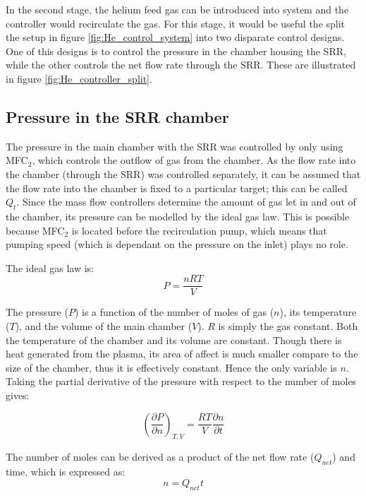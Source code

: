 In the second stage, the helium feed gas can be introduced into system and the controller would recirculate the gas. For this stage, it would be useful the split the setup in figure \ref{fig:He_control_system} into two disparate control designs. One of this designs is to control the pressure in the chamber housing the SRR, while the other controls the net flow rate through the SRR. These are illustrated in figure \ref{fig:He_controller_split}.


\subsection{Pressure in the SRR chamber}
\label{subsec:pressure_in_srr_chamber}

The pressure in the main chamber with the SRR was controlled by only using MFC$_2$, which controls the outflow of gas from the chamber. As the flow rate into the chamber (through the SRR) was controlled separately, it can be assumed that the flow rate into the chamber is fixed to a particular target; this can be called $Q_{t}$. Since the mass flow controllers determine the amount of gas let in and out of the chamber, its pressure can be modelled by the ideal gas law. This is possible because MFC$_2$ is located before the recirculation pump, which means that pumping speed (which is dependant on the pressure on the inlet) plays no role. 

The ideal gas law is:
\begin{equation}
    P = \frac{nRT}{V}
\end{equation} 

The pressure ($P$) is a function of the number of moles of gas ($n$), its temperature ($T$), and the volume of the main chamber ($V$). $R$ is simply the gas constant. Both the temperature of the chamber and its volume are constant. Though there is heat generated from the plasma, its area of affect is much smaller compare to the size of the chamber, thus it is effectively constant. Hence the only variable is $n$. Taking the partial derivative of the pressure with respect to the number of moles gives: 

\begin{equation}
    \left( \frac{\partial P}{\partial n} \right)_{T,V}= \frac{RT}{V} \frac{\partial n}{\partial t}
\end{equation}

The number of moles can be derived as a product of the net flow rate ($Q_{net}$) and time, which is expressed as: 
\begin{equation}
    n = Q_{net} t
\end{equation}

